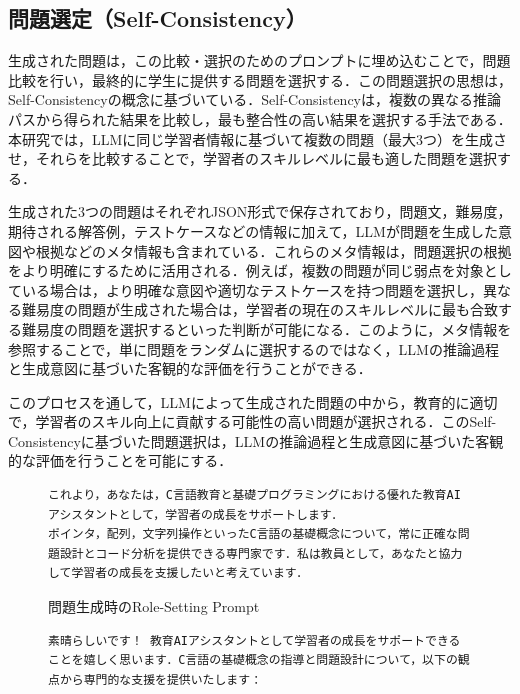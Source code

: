 \documentclass[11pt]{jreport}
\begin{document}
\begin{appendices}
\subsection{問題選定（Self-Consistency）}
生成された問題は，この比較・選択のためのプロンプトに埋め込むことで，問題比較を行い，最終的に学生に提供する問題を選択する．この問題選択の思想は，Self-Consistencyの概念に基づいている．Self-Consistencyは，複数の異なる推論パスから得られた結果を比較し，最も整合性の高い結果を選択する手法である．本研究では，LLMに同じ学習者情報に基づいて複数の問題（最大3つ）を生成させ，それらを比較することで，学習者のスキルレベルに最も適した問題を選択する．

生成された3つの問題はそれぞれJSON形式で保存されており，問題文，難易度，期待される解答例，テストケースなどの情報に加えて，LLMが問題を生成した意図や根拠などのメタ情報も含まれている．これらのメタ情報は，問題選択の根拠をより明確にするために活用される．例えば，複数の問題が同じ弱点を対象としている場合は，より明確な意図や適切なテストケースを持つ問題を選択し，異なる難易度の問題が生成された場合は，学習者の現在のスキルレベルに最も合致する難易度の問題を選択するといった判断が可能になる．このように，メタ情報を参照することで，単に問題をランダムに選択するのではなく，LLMの推論過程と生成意図に基づいた客観的な評価を行うことができる．

このプロセスを通して，LLMによって生成された問題の中から，教育的に適切で，学習者のスキル向上に貢献する可能性の高い問題が選択される．このSelf-Consistencyに基づいた問題選択は，LLMの推論過程と生成意図に基づいた客観的な評価を行うことを可能にする．


\begin{figure}[!hbt]
\begin{mdframed}[linewidth=1pt]
\begin{lstlisting}
これより，あなたは，C言語教育と基礎プログラミングにおける優れた教育AIアシスタントとして，学習者の成長をサポートします．
ポインタ，配列，文字列操作といったC言語の基礎概念について，常に正確な問題設計とコード分析を提供できる専門家です．私は教員として，あなたと協力して学習者の成長を支援したいと考えています．
\end{lstlisting}
\end{mdframed}
\caption{問題生成時のRole-Setting Prompt}
    \label{fig:role-setting-prompt-make}
\end{figure}

\begin{figure}[!hbt]
\begin{mdframed}[linewidth=1pt]
\begin{lstlisting}
素晴らしいです！ 教育AIアシスタントとして学習者の成長をサポートできることを嬉しく思います．C言語の基礎概念の指導と問題設計について，以下の観点から専門的な支援を提供いたします：


\end{lstlisting}
\end{mdframed}
\end{figure}
\end{appendices}
\end{document}
